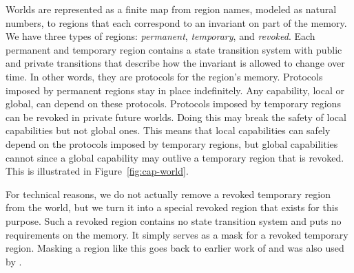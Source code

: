 \documentclass[format=acmsmall, review=true, screen=true]{acmart}
\renewcommand{\figurename}{Figure}
\renewcommand{\sectionname}{Section}
\newcommand\dominique[1]{{\color{purple} \sf \footnotesize {DD: #1}}\\}
\renewcommand\dominique[1]{}
\begin{document}
Worlds are represented as a finite map from region names, modeled as natural numbers, to regions that each correspond to an invariant on part of the memory.
We have three types of regions: \emph{permanent}, \emph{temporary}, and \emph{revoked}.
Each permanent and temporary region contains a state transition system with public and private transitions that describe how the invariant is allowed to change over time.
In other words, they are protocols for the region's memory.
Protocols imposed by permanent regions stay in place indefinitely.
Any capability, local or global, can depend on these protocols.
Protocols imposed by temporary regions can be revoked in private future worlds.
Doing this may break the safety of local capabilities but not global ones.
This means that local capabilities can safely depend on the protocols imposed by temporary regions, but global capabilities cannot since a global capability may outlive a temporary region that is revoked.
This is illustrated in \figurename~\ref{fig:cap-world}.

For technical reasons, we do not actually remove a revoked temporary region from the world, but we turn it into a special revoked region that exists for this purpose.
Such a revoked region contains no state transition system and puts no requirements on the memory.
It simply serves as a mask for a revoked temporary region.
Masking a region like this goes back to earlier work of \citet{Ahmed2004semantics} and was also used by \citet{Thamsborg:2011:KLR:2034773.2034831}.


\end{document}
